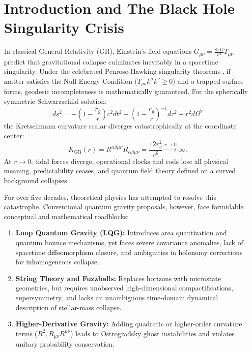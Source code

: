 \documentclass[11pt,a4paper]{article}
\begin{document}
\section{Introduction and The Black Hole Singularity Crisis}
In classical General Relativity (GR), Einstein's field equations $G_{\mu\nu} = \frac{8\pi G}{c^4} T_{\mu\nu}$ predict that gravitational collapse culminates inevitably in a spacetime singularity. Under the celebrated Penrose-Hawking singularity theorems \cite{penrose1965, hawking1975}, if matter satisfies the Null Energy Condition ($T_{\mu\nu} k^\mu k^\nu \ge 0$) and a trapped surface forms, geodesic incompleteness is mathematically guaranteed. For the spherically symmetric Schwarzschild solution:
\begin{equation}
ds^2 = -\left(1 - \frac{r_g}{r}\right) c^2 dt^2 + \left(1 - \frac{r_g}{r}\right)^{-1} dr^2 + r^2 d\Omega^2
\end{equation}
the Kretschmann curvature scalar diverges catastrophically at the coordinate center:
\begin{equation}
K_{\mathrm{GR}}(r) = R^{\alpha\beta\mu\nu} R_{\alpha\beta\mu\nu} = \frac{12 r_g^2}{r^6} \xrightarrow{r \to 0} \infty.
\end{equation}
At $r \to 0$, tidal forces diverge, operational clocks and rods lose all physical meaning, predictability ceases, and quantum field theory defined on a curved background collapses.

For over five decades, theoretical physics has attempted to resolve this catastrophe. Conventional quantum gravity proposals, however, face formidable conceptual and mathematical roadblocks:
\begin{enumerate}
    \item \textbf{Loop Quantum Gravity (LQG):} Introduces area quantization and quantum bounce mechanisms, yet faces severe covariance anomalies, lack of spacetime diffeomorphism closure, and ambiguities in holonomy corrections for inhomogeneous collapse.
    \item \textbf{String Theory and Fuzzballs:} Replaces horizons with microstate geometries, but requires unobserved high-dimensional compactifications, supersymmetry, and lacks an unambiguous time-domain dynamical description of stellar-mass collapse.
    \item \textbf{Higher-Derivative Gravity:} Adding quadratic or higher-order curvature terms ($R^2, R_{\mu\nu} R^{\mu\nu}$) leads to Ostrogradsky ghost instabilities and violates unitary probability conservation.
\end{enumerate}
\end{document}
